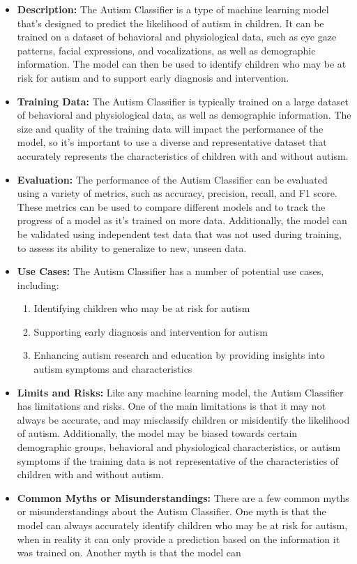 \begin{itemize}
    \item \textbf{Description:} The Autism Classifier is a type of machine learning model that's designed to predict the likelihood of autism in children. It can be trained on a dataset of behavioral and physiological data, such as eye gaze patterns, facial expressions, and vocalizations, as well as demographic information. The model can then be used to identify children who may be at risk for autism and to support early diagnosis and intervention.
    \item \textbf{Training Data:} The Autism Classifier is typically trained on a large dataset of behavioral and physiological data, as well as demographic information. The size and quality of the training data will impact the performance of the model, so it's important to use a diverse and representative dataset that accurately represents the characteristics of children with and without autism.
    \item \textbf{Evaluation:} The performance of the Autism Classifier can be evaluated using a variety of metrics, such as accuracy, precision, recall, and F1 score. These metrics can be used to compare different models and to track the progress of a model as it's trained on more data. Additionally, the model can be validated using independent test data that was not used during training, to assess its ability to generalize to new, unseen data.
    \item \textbf{Use Cases:} The Autism Classifier has a number of potential use cases, including:
        \begin{enumerate}  
            \item Identifying children who may be at risk for autism
            \item Supporting early diagnosis and intervention for autism
            \item Enhancing autism research and education by providing insights into autism symptoms and characteristics
        \end{enumerate}
    \item \textbf{Limits and Risks:} Like any machine learning model, the Autism Classifier has limitations and risks. One of the main limitations is that it may not always be accurate, and may misclassify children or misidentify the likelihood of autism. Additionally, the model may be biased towards certain demographic groups, behavioral and physiological characteristics, or autism symptoms if the training data is not representative of the characteristics of children with and without autism.
    \item \textbf{Common Myths or Misunderstandings:} There are a few common myths or misunderstandings about the Autism Classifier. One myth is that the model can always accurately identify children who may be at risk for autism, when in reality it can only provide a prediction based on the information it was trained on. Another myth is that the model can
\end{itemize}

